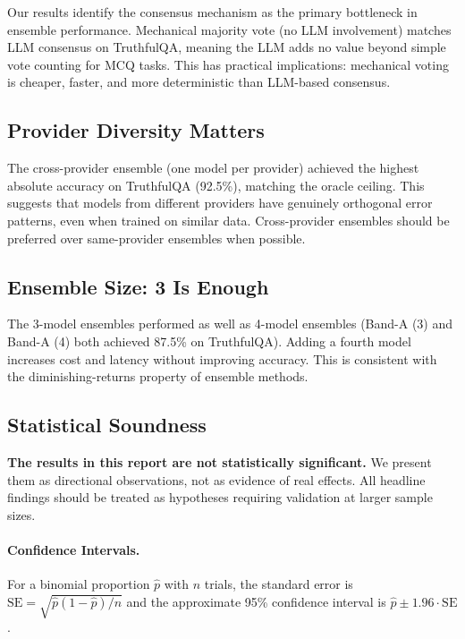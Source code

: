 \documentclass[11pt,a4paper]{article}
\begin{document}
Our results identify the consensus mechanism as the primary bottleneck in ensemble performance.
Mechanical majority vote (no LLM involvement) matches LLM consensus on TruthfulQA, meaning the LLM adds no value beyond simple vote counting for MCQ tasks.
This has practical implications: mechanical voting is cheaper, faster, and more deterministic than LLM-based consensus.

\subsection{Provider Diversity Matters}

The cross-provider ensemble (one model per provider) achieved the highest absolute accuracy on TruthfulQA (92.5\%), matching the oracle ceiling.
This suggests that models from different providers have genuinely orthogonal error patterns, even when trained on similar data.
Cross-provider ensembles should be preferred over same-provider ensembles when possible.

\subsection{Ensemble Size: 3 Is Enough}

The 3-model ensembles performed as well as 4-model ensembles (Band-A (3) and Band-A (4) both achieved 87.5\% on TruthfulQA).
Adding a fourth model increases cost and latency without improving accuracy.
This is consistent with the diminishing-returns property of ensemble methods.

\subsection{Statistical Soundness}
\label{sec:stats}

\textbf{The results in this report are not statistically significant.}
We present them as directional observations, not as evidence of real effects.
All headline findings should be treated as hypotheses requiring validation at larger sample sizes.

\paragraph{Confidence Intervals.}
For a binomial proportion $\hat{p}$ with $n$ trials, the standard error is $\text{SE} = \sqrt{\hat{p}(1-\hat{p})/n}$ and the approximate 95\% confidence interval is $\hat{p} \pm 1.96 \cdot \text{SE}$.
\end{document}
